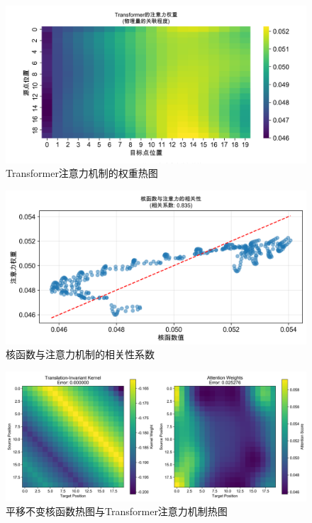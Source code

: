 \documentclass{MMCStyle}
\begin{document}
\begin{figure}[H]
\centering%
\includegraphics[width=13 cm]{figure/fig12.png}
\caption{Transformer注意力机制的权重热图}\label{fig12}
\end{figure}   
\unskip

\begin{figure}[H]
\centering%
\includegraphics[width=13 cm]{figure/fig13.png}
\caption{核函数与注意力机制的相关性系数}\label{fig13}
\end{figure}   
\unskip

\begin{figure}[H]
\centering%
\includegraphics[width=13 cm]{figure/fig14.png}
\caption{平移不变核函数热图与Transformer注意力机制热图}\label{fig14}
\end{figure}   
\unskip
\end{document}
